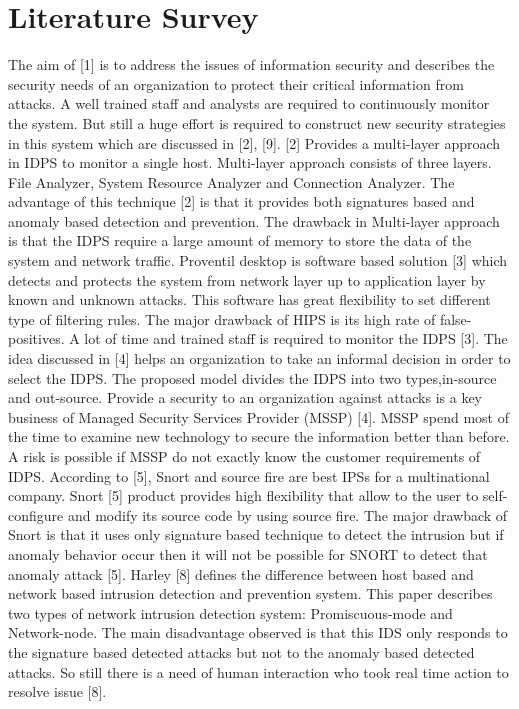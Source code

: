 \documentclass[12pt,a4paper]{report}
\begin{document}
\section{Literature Survey}
The aim of [1] is to address the issues of information security and describes the security needs of an organization to protect their critical information from attacks. A well trained staff and analysts are required to continuously monitor the system. But still a huge effort is required to construct new security strategies in this system which are discussed in [2], [9]. [2] Provides a multi-layer approach in IDPS to monitor a single host. Multi-layer approach consists of three layers. File Analyzer, System Resource Analyzer and Connection Analyzer. The advantage of this technique [2] is that it provides both signatures based and anomaly based detection and prevention. The drawback in Multi-layer approach is that the IDPS require a large amount of memory to store the data of the system and network traffic. 
Proventil desktop is software based solution [3] which detects and protects the system from network layer up to application layer by known and unknown attacks. This software has great flexibility to set 
different type of filtering rules. The major drawback of HIPS is its high rate of false-positives. A lot of time and trained staff is required to monitor the IDPS [3]. The idea discussed in [4] helps an organization to take an informal decision in order to select the IDPS. The proposed model divides the IDPS into two types,in-source and out-source. Provide a security to an organization against attacks is a key business of Managed Security Services Provider (MSSP) [4]. MSSP spend most of the time to examine new technology to secure the information better than before. A risk is possible if MSSP do not exactly know the customer requirements of IDPS. According to [5], Snort and source fire are best IPSs for a multinational company. Snort [5] product provides high flexibility that allow to the user to self-configure and modify its source code by using source fire. The major drawback of Snort is that it uses only signature based technique to detect the intrusion but if anomaly behavior occur then it will not be possible for SNORT to detect that anomaly attack [5]. Harley [8] defines the difference between host based and network based intrusion detection and prevention system. This paper describes two types of network intrusion detection system: Promiscuous-mode and Network-node. The main disadvantage observed is that this IDS only responds to the signature based detected attacks but not to the anomaly based detected attacks. So still there is a need of human interaction who took real time action to resolve issue [8]. 
\end{document}
